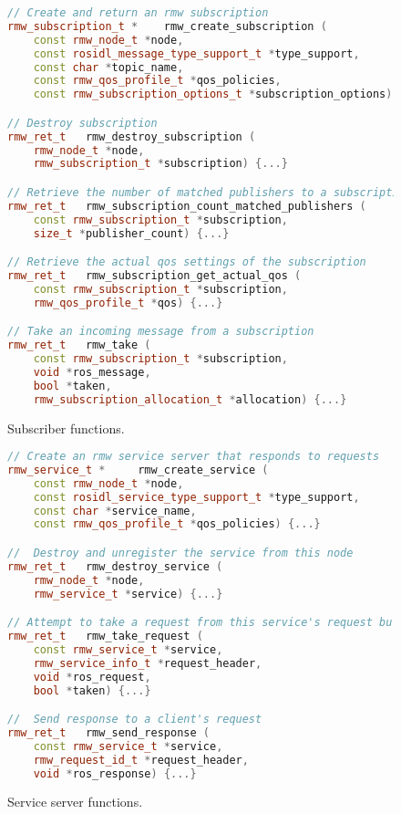         \begin{figure}[htbp]
            \begin{lstlisting}[language=C++]
// Create and return an rmw subscription
rmw_subscription_t * 	rmw_create_subscription (
    const rmw_node_t *node, 
    const rosidl_message_type_support_t *type_support, 
    const char *topic_name, 
    const rmw_qos_profile_t *qos_policies, 
    const rmw_subscription_options_t *subscription_options) {...}

// Destroy subscription
rmw_ret_t 	rmw_destroy_subscription (
    rmw_node_t *node, 
    rmw_subscription_t *subscription) {...}

// Retrieve the number of matched publishers to a subscription
rmw_ret_t 	rmw_subscription_count_matched_publishers (
    const rmw_subscription_t *subscription, 
    size_t *publisher_count) {...}

// Retrieve the actual qos settings of the subscription
rmw_ret_t 	rmw_subscription_get_actual_qos (
    const rmw_subscription_t *subscription, 
    rmw_qos_profile_t *qos) {...}

// Take an incoming message from a subscription
rmw_ret_t 	rmw_take (
    const rmw_subscription_t *subscription, 
    void *ros_message, 
    bool *taken, 
    rmw_subscription_allocation_t *allocation) {...}
\end{lstlisting}
            \caption{Subscriber functions.}
            \label{fig:funsub}
        \end{figure}

        \begin{figure}[htbp]
            \begin{lstlisting}[language=C++]
// Create an rmw service server that responds to requests
rmw_service_t * 	rmw_create_service (
    const rmw_node_t *node, 
    const rosidl_service_type_support_t *type_support, 
    const char *service_name, 
    const rmw_qos_profile_t *qos_policies) {...}

// 	Destroy and unregister the service from this node
rmw_ret_t 	rmw_destroy_service (
    rmw_node_t *node, 
    rmw_service_t *service) {...}

// Attempt to take a request from this service's request buffer
rmw_ret_t 	rmw_take_request (
    const rmw_service_t *service, 
    rmw_service_info_t *request_header, 
    void *ros_request, 
    bool *taken) {...}

// 	Send response to a client's request
rmw_ret_t 	rmw_send_response (
    const rmw_service_t *service, 
    rmw_request_id_t *request_header, 
    void *ros_response) {...}
\end{lstlisting}
            \caption{Service server functions.}
            \label{fig:funsrv}
        \end{figure}


